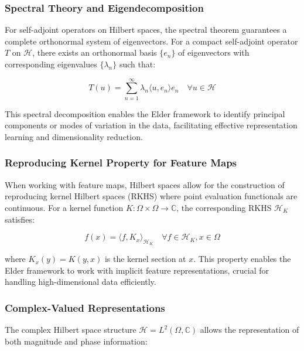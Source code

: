 \subsubsection{Spectral Theory and Eigendecomposition}

For self-adjoint operators on Hilbert spaces, the spectral theorem guarantees a complete orthonormal system of eigenvectors. For a compact self-adjoint operator $T$ on $\mathcal{H}$, there exists an orthonormal basis $\{e_n\}$ of eigenvectors with corresponding eigenvalues $\{\lambda_n\}$ such that:

\begin{equation}
T(u) = \sum_{n=1}^{\infty} \lambda_n \langle u, e_n \rangle e_n \quad \forall u \in \mathcal{H}
\end{equation}

This spectral decomposition enables the Elder framework to identify principal components or modes of variation in the data, facilitating effective representation learning and dimensionality reduction.

\subsubsection{Reproducing Kernel Property for Feature Maps}

When working with feature maps, Hilbert spaces allow for the construction of reproducing kernel Hilbert spaces (RKHS) where point evaluation functionals are continuous. For a kernel function $K: \Omega \times \Omega \rightarrow \mathbb{C}$, the corresponding RKHS $\mathcal{H}_K$ satisfies:

\begin{equation}
f(x) = \langle f, K_x \rangle_{\mathcal{H}_K} \quad \forall f \in \mathcal{H}_K, x \in \Omega
\end{equation}

where $K_x(y) = K(y,x)$ is the kernel section at $x$. This property enables the Elder framework to work with implicit feature representations, crucial for handling high-dimensional data efficiently.

\subsubsection{Complex-Valued Representations}

The complex Hilbert space structure $\mathcal{H} = L^2(\Omega, \mathbb{C})$ allows the representation of both magnitude and phase information:

